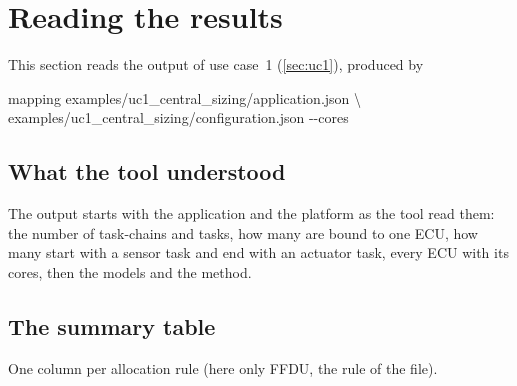 \section{Reading the results}
\label{sec:output}

This section reads the output of use case~1 (\cref{sec:uc1}), produced by
\begin{shell}
mapping examples/uc1\_central\_sizing/application.json \textbackslash\\
\quad examples/uc1\_central\_sizing/configuration.json -{}-cores
\end{shell}

\subsection{What the tool understood}

The output starts with the application and the platform as the tool read
them: the number of task-chains and tasks, how many are bound to one ECU,
how many start with a sensor task and end with an actuator task, every ECU
with its cores, then the models and the method.

\listing[\fontsize{6.3pt}{7.6pt}\selectfont]{listings/uc1_input.txt}

\subsection{The summary table}
\label{sec:summary}

One column per allocation rule (here only FFDU, the rule of the file).

